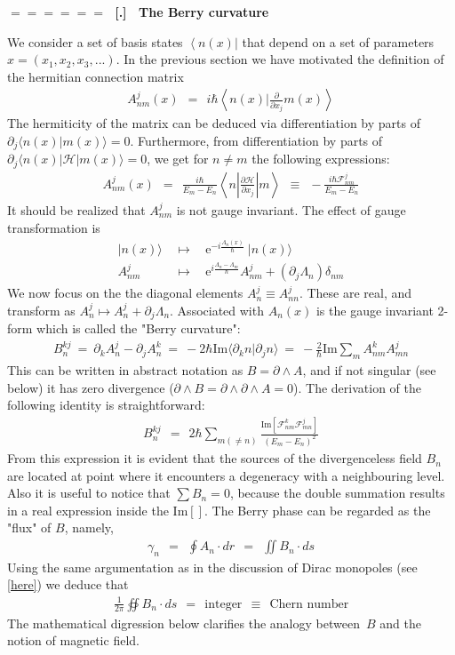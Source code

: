 \documentclass[onecolumn,fleqn]{revtex4}
\newcommand{\im}{\mathrm{Im}}
\newcommand{\eexp}{\mathrm{e}^}
\newcommand{\bra}[1]{\left\langle #1 \right|}
\newcommand{\beq}{\begin{eqnarray}}
\newcommand{\eeq}{\end{eqnarray}}
\renewcommand{\thesubsection}{\arabic{subsection}}
\renewcommand{\thesubsubsection}{\arabic{subsubsection}}
\newcommand{\sheadC}[1]
{
\addtocounter{subsubsection}{1}
\vspace{5mm}
{\Large\bf $=\!=\!=\!=\!=\!=\;$ [\thesubsection.\thesubsubsection] \ #1}  
\nopagebreak
\phantomsection
}
\begin{document}
\sheadC{The Berry curvature}
 
We consider a set of basis states $\bra{n(x)}$ that depend 
on a set of parameters ${x=(x_1,x_2,x_3,...)}$.    
In the previous section we have motivated the definition
of the hermitian connection matrix 
\beq
A^{j}_{nm}(x) \ \ = \ \ 
i\hbar \left\langle n(x) \Big|
\frac{\partial}{\partial x_j} m(x)\right\rangle
\eeq
The hermiticity  of the matrix can be deduced via differentiation by parts 
of $\partial_j \langle n(x)|m(x) \rangle  = 0$.
Furthermore, from differentiation by parts of $\partial_j \langle n(x)|{\mathcal{H}}|m(x) \rangle  = 0$,
we get for $n\ne m$ the following expressions:
\beq
A^{j}_{nm}(x) \ \ = \ \ \frac{i\hbar}{E_m - E_n}
\left\langle n \left|\frac{\partial {\mathcal{H}}}{\partial x_j}\right|m\right\rangle
\ \ \equiv \ \ -\frac{i\hbar \mathcal{F}^j_{nm}}{E_m - E_n}
\eeq
It should be realized that $A^{j}_{nm}$ is not gauge invariant.  
The effect of gauge transformation is
\beq
|n(x)\rangle \ & \ \mapsto \ & \ \eexp{-i\frac{\Lambda_n(x)}{\hbar}} \ |n(x)\rangle 
\\ \nonumber
A^{j}_{nm} \ & \ \mapsto \ & \
\eexp{i\frac{\Lambda_n{-}\Lambda_m}{\hbar}} A^{j}_{nm}
+ (\partial_j \Lambda_n)\delta_{nm} \nonumber
\eeq
We now focus on the the diagonal elements $A^{j}_{n} \equiv A^{j}_{nn}$. 
These are real, and transform as $A^{j}_{n} \mapsto A^{j}_{n} + \partial_j \Lambda_n$.
Associated with $A_n(x)$ is the gauge invariant 2-form 
which is called the "Berry curvature": 
\beq
B^{kj}_{n} 
\ = \ 
\partial_k A^{j}_{n} - \partial_j A^{k}_{n} 
\ = \ -2\hbar \im\langle\partial_k n|\partial_j n\rangle 
\ = \ -\frac{2}{\hbar}\im \sum_{m}
A^{k}_{nm} A^{j}_{mn}
\eeq
This can be written in abstract notation as $B=\partial \wedge A$, 
and if not singular (see below) it has zero divergence 
(${\partial \wedge B=  \partial \wedge \partial \wedge A = 0}$).  
The derivation of the following identity is straightforward: 
\beq
B^{kj}_{n} \ \ = \ \ 2\hbar \sum_{m(\ne n)}
\frac{\im\left[
\mathcal{F}^k_{nm}{\mathcal{F}}^j_{mn}\right]}
{(E_m-E_n)^2}
\eeq
From this expression it is evident that the sources of the 
divergenceless field $B_n$ are located at point where it 
encounters a degeneracy with a neighbouring level.  
Also it is useful to notice that ${\sum B_n =0}$, 
because the double summation results in a real expression inside the $\im[]$.   
The Berry phase can be regarded as the "flux" of $B$, namely, 
\beq
\gamma_n \ \ = \ \ \oint A_n \cdot dr  \ \ = \ \ \iint B_n \cdot ds
\eeq
Using the same argumentation as in the discussion of Dirac monopoles (see \hyperref[sMonopoles]{[here]})
we deduce that
\beq
\frac{1}{2\pi}\oiint B_n \cdot ds \ \ = \ \ \text{integer} \ \ \equiv \ \ \text{Chern number} 
\eeq
The mathematical digression below clarifies the analogy between~$B$ 
and the notion of magnetic field.
\end{document}
